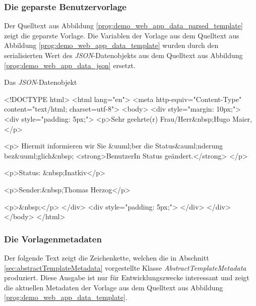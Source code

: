 \subsubsection{Die geparste Benutzervorlage}
Der Quelltext aus Abbildung \ref{prog:demo_web_app_data_parsed_template} zeigt die geparste Vorlage. Die Variablen der Vorlage aus dem Quelltext aus Abbildung \ref{prog:demo_web_app_data_template} wurden durch den serialisierten Wert des \emph{JSON}-Datenobjekts aus dem Quelltext aus Abbildung \ref{prog:demo_web_app_data_json} ersetzt.

\begin{program}[h]
\caption{Das \emph{JSON}-Datenobjekt}
\label{prog:demo_web_app_data_parsed_template}
\begin{HtmlCode}
<!DOCTYPE html>
<html lang="en">
    <meta http-equiv="Content-Type" content="text/html; charset=utf-8">
<body>
<div style="margin: 10px;">
    <div style="padding: 5px;">
        <p>Sehr geehrte(r) Frau/Herr&nbsp;Hugo Maier,</p>

        <p>
            Hiermit informieren wir Sie &uuml;ber die 
            Status&auml;nderung bez&uuml;glich&nbsp;
            <strong>BenutzerIn Status geändert.</strong>
        </p>

        <p>Status: &nbsp;Inatkiv</p>

        <p>Sender:&nbsp;Thomas Herzog</p>

        <p>&nbsp;</p>
    </div>
    <div style="padding: 5px;">
    </div>
</div>
</body>
</html>
\end{HtmlCode}
\end{program}

\subsubsection{Die Vorlagenmetadaten}
Der folgende Text zeigt die Zeichenkette, welchen die in Abschnitt \ref{sec:abstractTemplateMetadata} vorgestellte Klasse \emph{AbstractTemplateMetadata} produziert. Diese Ausgabe ist nur für Entwicklungszwecke interessant und zeigt die aktuellen Metadaten der Vorlage aus dem Quelltext aus Abbildung \ref{prog:demo_web_app_data_template}.

